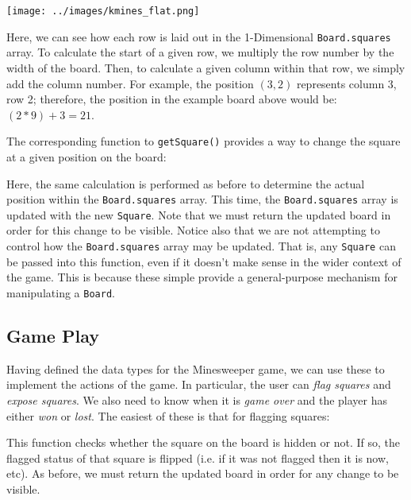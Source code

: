 \begin{center}
\texttt{[image: ../images/kmines\_flat.png]}
\end{center}

Here, we can see how each row is laid out in the 1-Dimensional \lstinline{Board.squares} array.  To calculate the start of a given row, we multiply the row number by the width of the board.  Then, to calculate a given column within that row, we simply add the column number.  For example, the position $(3,2)$ represents column 3, row 2; therefore, the position in the example board above would be: $(2 * 9) + 3 = 21$.

The corresponding function to \lstinline{getSquare()} provides a way to change the square at a given position on the board:



Here, the same calculation is performed as before to determine the actual position within the \lstinline{Board.squares} array.  This time, the \lstinline{Board.squares} array is updated with the new \lstinline{Square}.  Note that we must return the updated board in order for this change to be visible.  Notice also that we are not attempting to control how the \lstinline{Board.squares} array may be updated.  That is, any \lstinline{Square} can be passed into this function, even if it doesn't make sense in the wider context of the game.  This is because these simple provide a general-purpose mechanism for manipulating a \lstinline{Board}.

\subsection{Game Play}

Having defined the data types for the Minesweeper game, we can use these to implement the actions of the game.  In particular, the user can {\em flag squares} and {\em expose squares}.  We also need to know when it is {\em game over} and the player has either {\em won} or {\em lost}.  The easiest of these is that for flagging squares:



This function checks whether the square on the board is hidden or not.  If so, the flagged status of that square is flipped (i.e. if it was not flagged then it is now, etc).  As before,  we must return the updated board in order for any change to be visible.

